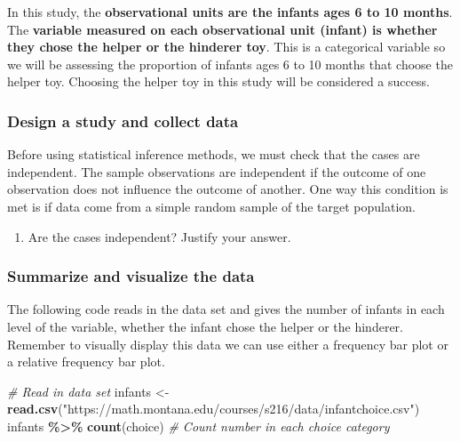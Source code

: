 \documentclass[
]{report}
\newenvironment{Shaded}{\begin{snugshade}}{\end{snugshade}}
\newcommand{\CommentTok}[1]{\textcolor[rgb]{0.56,0.35,0.01}{\textit{#1}}}
\newcommand{\FunctionTok}[1]{\textcolor[rgb]{0.13,0.29,0.53}{\textbf{#1}}}
\newcommand{\NormalTok}[1]{#1}
\newcommand{\OtherTok}[1]{\textcolor[rgb]{0.56,0.35,0.01}{#1}}
\newcommand{\SpecialCharTok}[1]{\textcolor[rgb]{0.81,0.36,0.00}{\textbf{#1}}}
\newcommand{\StringTok}[1]{\textcolor[rgb]{0.31,0.60,0.02}{#1}}
\providecommand{\tightlist}{%
  \setlength{\itemsep}{0pt}\setlength{\parskip}{0pt}}
\begin{document}
In this study, the \textbf{observational units are the infants ages 6 to 10 months}. The \textbf{variable measured on each observational unit (infant) is whether they chose the helper or the hinderer toy}. This is a categorical variable so we will be assessing the proportion of infants ages 6 to 10 months that choose the helper toy. Choosing the helper toy in this study will be considered a success.

\hypertarget{design-a-study-and-collect-data}{%
\subsubsection*{Design a study and collect data}\label{design-a-study-and-collect-data}}

Before using statistical inference methods, we must check that the cases are independent. The sample observations are independent if the outcome of one observation does not influence the outcome of another. One way this condition is met is if data come from a simple random sample of the target population.

\begin{enumerate}
\def\labelenumi{\arabic{enumi}.}
\tightlist
\item
  Are the cases independent? Justify your answer.
\end{enumerate}

\vspace{0.8in}

\hypertarget{summarize-and-visualize-the-data}{%
\subsubsection*{Summarize and visualize the data}\label{summarize-and-visualize-the-data}}

The following code reads in the data set and gives the number of infants in each level of the variable, whether the infant chose the helper or the hinderer. Remember to visually display this data we can use either a frequency bar plot or a relative frequency bar plot.

\begin{Shaded}
\begin{Highlighting}[]
 \CommentTok{\# Read in data set}
\NormalTok{infants }\OtherTok{\textless{}{-}} \FunctionTok{read.csv}\NormalTok{(}\StringTok{"https://math.montana.edu/courses/s216/data/infantchoice.csv"}\NormalTok{)}
\NormalTok{infants }\SpecialCharTok{\%\textgreater{}\%} \FunctionTok{count}\NormalTok{(choice)  }\CommentTok{\# Count number in each choice category}
\end{Highlighting}
\end{Shaded}
\end{document}
